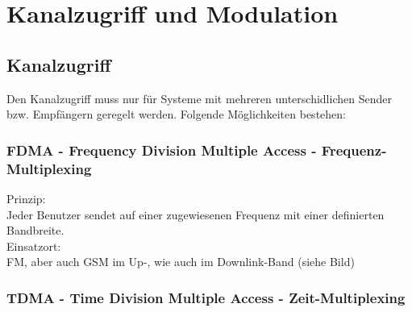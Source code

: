 \newpage
\section{Kanalzugriff und Modulation }
\subsection{Kanalzugriff}
	Den Kanalzugriff muss nur für Systeme mit mehreren unterschidlichen Sender bzw.
	Empfängern geregelt werden. Folgende Möglichkeiten bestehen:\\

\subsubsection{FDMA - Frequency Division Multiple Access - Frequenz-Multiplexing
} Prinzip:\\Jeder Benutzer sendet auf einer zugewiesenen Frequenz mit einer
		definierten Bandbreite.\\
		Einsatzort:\\FM, aber auch GSM im Up-, wie auch im Downlink-Band (siehe
		Bild)\\
\subsubsection{TDMA - Time Division Multiple Access - Zeit-Multiplexing
}

